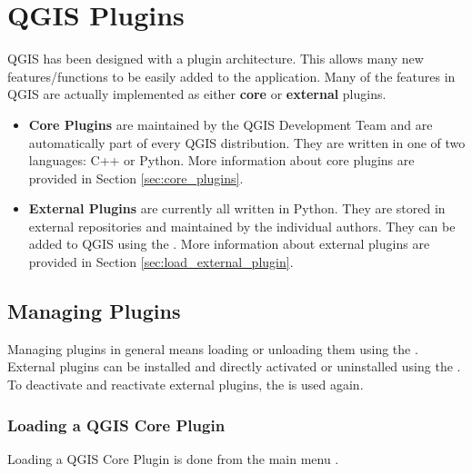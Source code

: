 
\chapter{QGIS Plugins}\label{sec:plugins}


QGIS has been designed with a plugin architecture.
This allows many new features/functions to be easily added to the application.
Many of the features in QGIS are actually implemented as either \textbf{core}
or \textbf{external} plugins.

\begin{itemize}[label=--]
\item \textbf{Core Plugins} are maintained by the QGIS Development
Team and are automatically part of every QGIS distribution.
They are written in one of two languages: C++ or Python.
More information about core plugins are provided in Section \ref{sec:core_plugins}.
\item \textbf{External Plugins} are currently all written in Python.
They are stored in external repositories and maintained by the individual authors.
They can be added to QGIS using the .
More information about external plugins are provided in Section \ref{sec:load_external_plugin}.
\end{itemize}

\section{Managing Plugins}\label{sec:managing_plugins}

Managing plugins in general means loading or unloading them using
the . External plugins can be installed and
directly activated or uninstalled using the . To deactivate and reactivate external plugins, the
 is used again.

\subsection{Loading a QGIS Core Plugin}\label{sec:load_core_plugin}

Loading a QGIS Core Plugin is done from the main menu 
\arrow {}.

